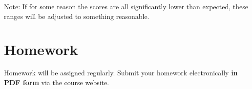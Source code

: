 \documentclass[12pt]{article}
\begin{document}
Note: If for some reason the scores are all significantly lower than expected, these ranges will be adjusted to something reasonable.
\fi






\section{Homework}

Homework will be assigned regularly.
Submit your homework electronically {\bf in PDF form} via the course website. 
\end{document}
